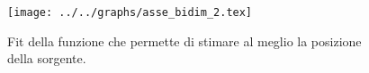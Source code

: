 \begin{figure}[h] \centering\texttt{[image: ../../graphs/asse\_bidim\_2.tex]}\caption{Fit della funzione che permette di stimare al meglio la posizione della sorgente. }\label{gr:asse_bidim_2} \end{figure}
